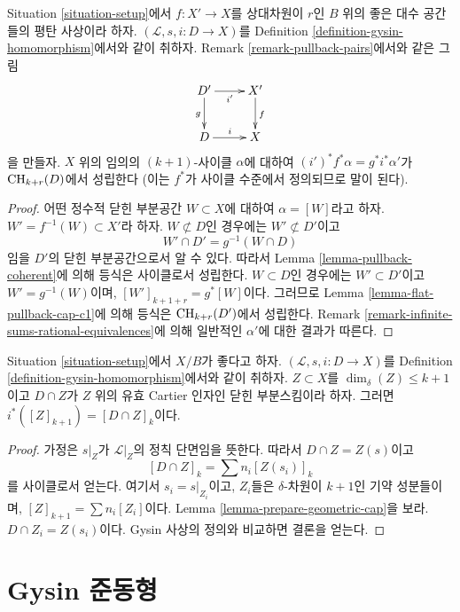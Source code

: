 \begin{lemma}
\label{lemma-gysin-flat-pullback}
Situation \ref{situation-setup}에서 $f : X' \to X$를 상대차원이
$r$인 $B$ 위의 좋은 대수 공간들의 평탄 사상이라 하자.
$(\mathcal{L}, s, i : D \to X)$를 Definition
\ref{definition-gysin-homomorphism}에서와 같이 취하자. Remark
\ref{remark-pullback-pairs}에서와 같은 그림
$$
\xymatrix{
D' \ar[d]_g \ar[r]_{i'} & X' \ar[d]^f \\
D \ar[r]^i & X
}
$$
을 만들자. $X$ 위의 임의의 $(k + 1)$-사이클 $\alpha$에 대하여
$(i')^*f^*\alpha = g^*i^*\alpha'$가 $\mathop{\mathrm{CH}}\nolimits_{k + r}(D)$에서 성립한다
(이는 $f^*$가 사이클 수준에서 정의되므로 말이 된다).
\end{lemma}

\begin{proof}
어떤 정수적 닫힌 부분공간 $W \subset X$에 대하여
$\alpha = [W]$라고 하자. $W' = f^{-1}(W) \subset X'$라 하자.
$W \not \subset D$인 경우에는 $W' \not \subset D'$이고
$$
W' \cap D' = g^{-1}(W \cap D)
$$
임을 $D'$의 닫힌 부분공간으로서 알 수 있다. 따라서 Lemma
\ref{lemma-pullback-coherent}에 의해 등식은 사이클로서 성립한다.
$W \subset D$인 경우에는 $W' \subset D'$이고
$W' = g^{-1}(W)$이며, $[W']_{k + 1 + r} = g^*[W]$이다.
그러므로 Lemma \ref{lemma-flat-pullback-cap-c1}에 의해 등식은
$\mathop{\mathrm{CH}}\nolimits_{k + r}(D')$에서 성립한다. Remark
\ref{remark-infinite-sums-rational-equivalences}에 의해
일반적인 $\alpha'$에 대한 결과가 따른다.
\end{proof}

\begin{lemma}
\label{lemma-easy-gysin}
Situation \ref{situation-setup}에서 $X/B$가 좋다고 하자.
$(\mathcal{L}, s, i : D \to X)$를 Definition
\ref{definition-gysin-homomorphism}에서와 같이 취하자.
$Z \subset X$를 $\dim_\delta(Z) \leq k + 1$이고
$D \cap Z$가 $Z$ 위의 유효 Cartier 인자인 닫힌 부분스킴이라 하자.
그러면 $i^*([Z]_{k + 1}) = [D \cap Z]_k$이다.
\end{lemma}

\begin{proof}
가정은 $s|_Z$가 $\mathcal{L}|_Z$의 정칙 단면임을 뜻한다.
따라서 $D \cap Z = Z(s)$이고
$$
[D \cap Z]_k = \sum n_i [Z(s_i)]_k
$$
를 사이클로서 얻는다. 여기서 $s_i = s|_{Z_i}$이고, $Z_i$들은
$\delta$-차원이 $k + 1$인 기약 성분들이며,
$[Z]_{k + 1} = \sum n_i[Z_i]$이다. Lemma
\ref{lemma-prepare-geometric-cap}을 보라.
$D \cap Z_i = Z(s_i)$이다. Gysin 사상의 정의와 비교하면 결론을 얻는다.
\end{proof}

\section{Gysin 준동형}
\label{section-gysin}

